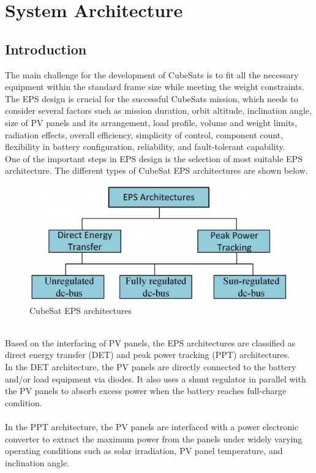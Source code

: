 \chapter{System Architecture}
\section[Introduction]{Introduction}

The main challenge for the development of CubeSats is to fit all the necessary equipment within the standard frame size while meeting the weight constraints. The EPS design is crucial for the successful CubeSats mission, which needs to consider several factors such as mission duration, orbit altitude, inclination angle, size of PV panels and its arrangement, load profile, volume and weight limits, radiation effects, overall efficiency, simplicity of control, component count, flexibility in battery configuration, reliability, and fault-tolerant capability. 
\\ 
One of the important steps in EPS design is the selection of most suitable EPS architecture. The different types of CubeSat EPS architectures are shown below.
\\ 
\begin{figure}[H]
	\centering
	\includegraphics[width=0.7\columnwidth]{IMGS/EPSarchitectures.jpg}
	\caption{CubeSat EPS architectures}
	\label{fig:arch}
\end{figure} 
\\ 
Based on the interfacing of PV panels, the EPS architectures are classified as direct energy transfer (DET) and peak power tracking (PPT) architectures. 
\\ 
In the DET architecture, the PV panels are directly connected to the battery and/or load equipment via diodes. It also uses a shunt regulator in parallel with the PV panels to absorb excess power when the battery reaches full-charge condition.
\\ \\
 In the PPT architecture, the PV panels are interfaced with a power electronic converter to extract the maximum power from the panels under widely varying operating conditions such as solar irradiation, PV panel temperature, and inclination angle. 
